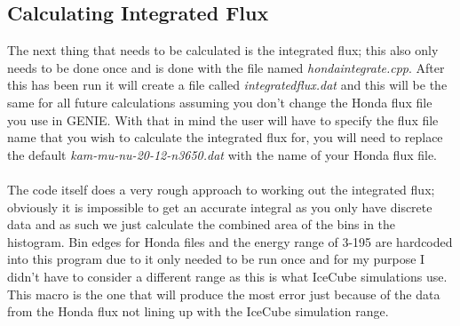 \documentclass[12pt]{article}
\numberwithin{equation}{section}
\numberwithin{figure}{section}
\begin{document}
\subsection{Calculating Integrated Flux} %
\label{sub:calculating_integrated_flux}
The next thing that needs to be calculated is the integrated flux; this also only needs to be done once and is done with the file named \emph{honda\textunderscore integrate.cpp}. After this has been run it will create a file called \emph{integrated\textunderscore flux.dat} and this will be the same for all future calculations assuming you don't change the Honda flux file you use in GENIE. With that in mind the user will have to specify the flux file name that you wish to calculate the integrated flux for, you will need to replace the default \emph{kam-mu-nu-20-12-n3650.dat} with the name of your Honda flux file.\\
\\
The code itself does a very rough approach to working out the integrated flux; obviously it is impossible to get an accurate integral as you only have discrete data and as such we just calculate the combined area of the bins in the histogram. Bin edges for Honda files and the energy range of 3-195 are hardcoded into this program due to it only needed to be run once and for my purpose I didn't have to consider a different range as this is what IceCube simulations use. This macro is the one that will produce the most error just because of the data from the Honda flux not lining up with the IceCube simulation range.
%
\end{document}
